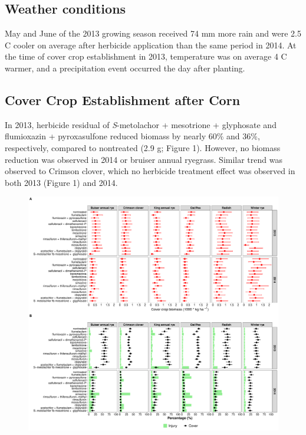 \documentclass[agriculture,article,submit,moreauthors,pdftex]{mdpi}
\begin{document}
\hypertarget{weather-conditions}{%
\subsection{Weather conditions}\label{weather-conditions}}

May and June of the 2013 growing season received 74 mm more rain and
were 2.5 C cooler on average after herbicide application than the same
period in 2014. At the time of cover crop establishment in 2013,
temperature was on average 4 C warmer, and a precipitation event
occurred the day after planting.

\hypertarget{cover-crop-establishment-after-corn}{%
\subsection{Cover Crop Establishment after
Corn}\label{cover-crop-establishment-after-corn}}

In 2013, herbicide residual of \emph{S}-metolachor + mesotrione +
glyphosate and flumioxazin + pyroxasulfone reduced biomass by nearly
60\% and 36\%, respectively, compared to nontreated (2.9 g; Figure 1).
However, no biomass reduction was observed in 2014 or bruiser annual
ryegrass. Similar trend was observed to Crimson clover, which no
herbicide treatment effect was observed in both 2013 (Figure 1) and
2014.

\begin{figure}[H]
\centering
\includegraphics[width=17 cm]{CornF.pdf}
\caption{}
\end{figure}
\end{document}
